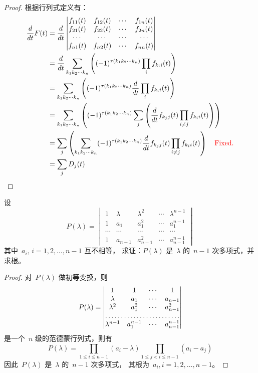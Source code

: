\documentclass[twoside,openright]{book}
\begin{document}
\begin{CJK*}{UTF8}{}
\begin{proof}
根据行列式定义有：
\[
\begin{split}
\frac{d}{dt} F(t) &=
\frac{d}{dt}
\begin{vmatrix}
f_{11}(t) & f_{12}(t) & \dotsm & f_{1n}(t) \\
f_{21}(t) & f_{22}(t) & \dotsm & f_{2n}(t) \\
\dotsm    & \dotsm    & \dotsm & \dotsm    \\
f_{n1}(t) & f_{n2}(t) & \dotsm & f_{nn}(t)
\end{vmatrix} \\
&=
\frac{d}{dt} \sum_{k_1k_2\dotsm k_n} \left( (-1)^{\tau(k_1 k_2 \dotsm k_n)} \prod_{i} f_{k_ii}(t) \right) \\
&=
\sum_{k_1k_2\dotsm k_n} \left( (-1)^{\tau(k_1 k_2 \dotsm k_n)} \frac{d}{dt} \prod_{i} f_{k_ii}(t) \right) \\
&=
\sum_{k_1k_2\dotsm k_n} \left( (-1)^{\tau(k_1 k_2 \dotsm k_n)} \sum_{j} \left( \frac{d}{dt} f_{k_jj}(t) \prod_{i\neq j} f_{k_ii}(t) \right) \right) \\
&=
\sum_{j} \left( \sum_{k_1k_2\dotsm k_n} (-1)^{\tau(k_1 k_2 \dotsm k_n)} \frac{d}{dt} f_{k_jj}(t) \prod_{i\neq j} f_{k_ii}(t) \right) {\quad\color{red}\text{Fixed.}} \\
&=
\sum_{j} D_j(t)
\end{split}
\]
\end{proof}

\begin{quest}
\label{quest:71}
设
\[
P(\lambda) =
\begin{vmatrix}
1      & \lambda & \lambda^2 & \dotsm & \lambda^{n-1} \\
1      & a_1     & a_1^2     & \dotsm & a_1^{n-1}     \\
\dotsm & \dotsm  & \dotsm    & \dotsm & \dotsm        \\
1      & a_{n-1} & a_{n-1}^2 & \dotsm & a_{n-1}^{n-1}
\end{vmatrix}
\]
其中\ $a_i,\,i=1,2,\dotsc,n-1$ 互不相等，
求证：$P(\lambda)$ 是\ $\lambda$ 的\ $n-1$ 次多项式，并求根。
\end{quest}
\begin{proof}
对\ $P(\lambda)$ 做初等变换，则
\[
P(\lambda) =
\begin{vmatrix}
1            & 1       & \dotsm    & 1  \\
\lambda      & a_1     &    \dotsm & a_{n-1}     \\
\lambda^2    & a_1^2   & \dotsm    & a_{n-1}^2 \\
\hdotsfor{4} \\
\lambda^{n-1}& a_1^{n-1} & \dotsm & a_{n-1}^{n-1} \\
\end{vmatrix}
\]
是一个\ $n$ 级的范德蒙行列式，则有
\[
P(\lambda)=\prod_{1 \le i \le n-1}(a_i-\lambda)\prod_{1 \le j < i \le n-1}(a_i-a_j)
\]
因此\ $P(\lambda)$ 是\ $\lambda$ 的\ $n-1$ 次多项式，
其根为\ $a_i,i=1,2,\dotsc,n-1$。
\end{proof}


\end{CJK*}
\end{document}
